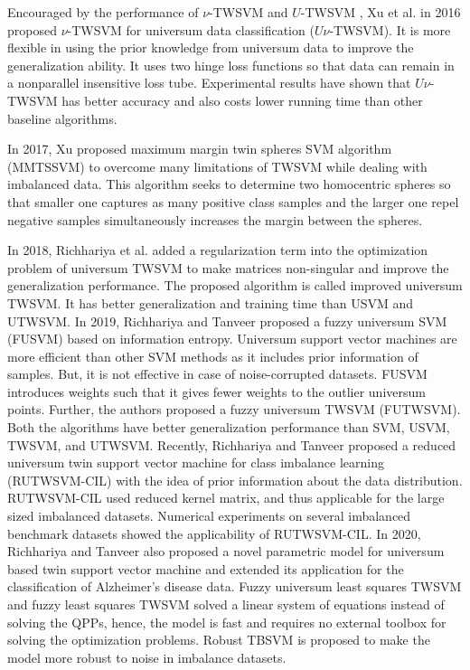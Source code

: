 \documentclass[pdflatex,sn-mathphys]{sn-jnl}%
\theoremstyle{thmstyleone}%
\theoremstyle{thmstyletwo}%
\theoremstyle{thmstylethree}%
\begin{document}
Encouraged by the performance of $\nu$-TWSVM \cite{peng2010nu} and $U$-TWSVM \cite{qi2012twin}, Xu et al. \cite{xu2016nu} in 2016 proposed $\nu$-TWSVM for universum data classification ($U\nu$-TWSVM). It is more flexible in using the prior knowledge from universum data to improve the generalization ability. It uses two hinge loss functions so that data can remain in a nonparallel insensitive loss tube. Experimental results have shown that $U\nu$-TWSVM has better accuracy and also costs lower running time than other baseline algorithms. 

In 2017, Xu \cite{xu2017maximum} proposed maximum margin twin spheres SVM algorithm (MMTSSVM) to overcome many limitations of TWSVM while dealing with imbalanced data. This algorithm seeks to determine two homocentric spheres so that smaller one captures as many positive class samples and the larger one repel negative samples simultaneously increases the margin between the spheres. 

In 2018, Richhariya et al. \cite{richhariya2018improved} added a regularization term into the optimization problem of universum TWSVM to make matrices non-singular and improve the generalization performance. The proposed algorithm is called improved universum TWSVM. It has better generalization and training time than USVM and UTWSVM. In 2019, Richhariya and Tanveer \cite{richhariya2019fuzzy} proposed a fuzzy universum SVM (FUSVM) based on information entropy. Universum support vector machines are more efficient than other SVM methods as it includes prior information of samples. But, it is not effective in case of noise-corrupted datasets. FUSVM introduces weights such that it gives fewer weights to the outlier universum points. Further, the authors proposed a fuzzy universum TWSVM (FUTWSVM). Both the algorithms have better generalization performance than SVM, USVM, TWSVM, and UTWSVM. Recently, Richhariya and Tanveer \cite {richhariya2020reduced} proposed a reduced universum twin support vector machine for class imbalance learning (RUTWSVM-CIL) with the idea of prior information about the data distribution. RUTWSVM-CIL used reduced kernel matrix, and thus applicable for the large sized imbalanced datasets. Numerical experiments on several imbalanced benchmark datasets showed the applicability of RUTWSVM-CIL. In 2020, Richhariya and Tanveer \cite{richhariya2020universum} also proposed a novel parametric model for universum based twin  support  vector machine and extended its application for the classification of Alzheimer's disease data. Fuzzy universum least squares TWSVM \cite{richhariya2021fuzzy,borah2018improved} and fuzzy least squares  TWSVM \cite{ganaie2021fuzzy,gupta2018entropy} solved a linear system of equations instead of solving the QPPs, hence, the model is fast and requires no external toolbox for solving the optimization problems. Robust  TBSVM \cite{borah2021robust} is proposed to make the model more robust to noise in imbalance datasets.  
\end{document}
